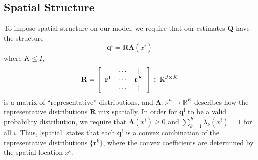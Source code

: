 \documentclass[english]{scrartcl}
\newcommand\R[0]{\mathbb{R}}
\begin{document}
	\subsection{Spatial Structure}
		To impose spatial structure on our model, we require that our estimates $\mathbf{Q}$ have the structure 
		\begin{equation}
			\mathbf{q}^i = \mathbf{R} \mathbf{\Lambda}(x^i) \label{spatial}
		\end{equation}
		where $K \leq I$, 
		\begin{equation}
		\mathbf{R} = \left[\begin{array}{c c c}
			| & \cdots & | \\
			\mathbf{r}^1 & \cdots & \mathbf{r}^K \\
			| & \cdots & | 
		\end{array}\right] \in \R^{J \times K}
		\end{equation}
		is a matrix of ``representative'' distributions, and $\mathbf{\Lambda}: \R^n \rightarrow \R^K$ describes how the representative distributions $\mathbf{R}$ mix spatially. In order for $\mathbf{q^i}$ to be a valid probability distribution, we require that $\mathbf{\Lambda}(x^i) \geq 0$ and $\sum_{k = 1}^K \lambda_k(x^i) = 1$ for all $i$. Thus, \eqref{spatial} states that each $\mathbf{q}^i$ is a convex combination of the representative distributions $\{\mathbf{r}^k\}$, where the convex coefficients are determined by the spatial location $x^i$. 
\end{document}
